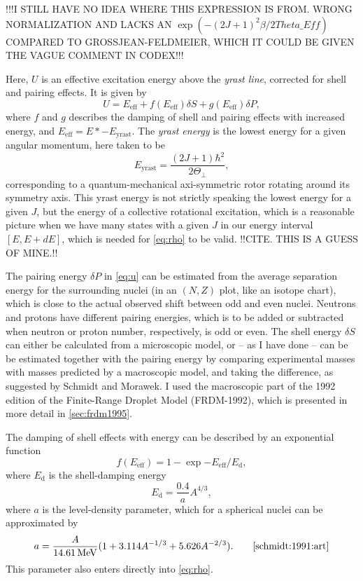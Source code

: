 !!!I STILL HAVE NO IDEA WHERE THIS EXPRESSION IS FROM. WRONG NORMALIZATION AND LACKS AN $\exp(-(2J+1)^2\beta/2Theta\_Eff)$ COMPARED TO GROSSJEAN-FELDMEIER, WHICH IT COULD BE GIVEN THE VAGUE COMMENT IN CODEX!!!

Here, $U$ is an effective excitation energy above the \emph{yrast line}, corrected for shell and pairing effects. It is given by
\begin{equation}
U=E_\text{eff} + f(E_\text{eff})\delta S + g(E_\text{eff})\delta P,\label{eq:u}
\end{equation}
where $f$ and $g$ describes the damping of shell and pairing effects with increased energy, and $E_\text{eff} = E*-E_\text{yrast}$. The \emph{yrast energy} is the lowest energy for a given angular momentum, here taken to be
\begin{equation}
E_\text{yrast} = \frac{(2J+1)\hbar^2}{2\Theta_\perp},
\end{equation}
corresponding to a quantum-mechanical axi-symmetric rotor rotating around its symmetry axis. This yrast energy is not strictly speaking the lowest energy for a given $J$, but the energy of a collective rotational excitation, which is a reasonable picture when we have many states with a given $J$ in our energy interval $[E,E+dE]$, which is needed for \eqref{eq:rho} to be valid. !!CITE. THIS IS A GUESS OF MINE.!!

The pairing energy $\delta P$ in \eqref{eq:u} can be estimated from the average separation energy for the surrounding nuclei (in an $(N,Z)$ plot, like an isotope chart), which is close to the actual observed shift between odd and even nuclei\cite{ericson:1960}. Neutrons and protons have different pairing energies, which is to be added or subtracted when neutron or proton number, respectively, is odd or even. 
The shell energy $\delta S$ can either be calculated from a microscopic model, or -- as I have done -- can be be estimated together with the pairing energy by comparing experimental masses with masses predicted by a macroscopic model, and taking the difference, as suggested by Schmidt and Morawek\cite{schmidt:1991:art}. I used the macroscopic part of the 1992 edition of the Finite-Range Droplet Model (FRDM-1992)\cite{moller1995}, which is presented in more detail in \autoref{sec:frdm1995}.

The damping of shell effects with energy can be described by an exponential function
\begin{equation}
f(E_\text{eff}) = 1-\exp{-E_\text{eff}/E_\text{d}},
\end{equation}
where $E_\text{d}$ is the shell-damping energy 
\begin{equation}
E_\text{d} = \frac{0.4}{a} A^{4/3},
\end{equation}
where $a$ is the level-density parameter, which for a spherical nuclei can be approximated by
\begin{equation}
a=\frac{A}{\unit[14.61]{MeV}}(1+3.114 A^{-1/3} + 5.626 A^{-2/3}).\qquad\cite{schmidt:1991:art}\label{eq:a}
\end{equation}
This parameter also enters directly into \eqref{eq:rho}.

